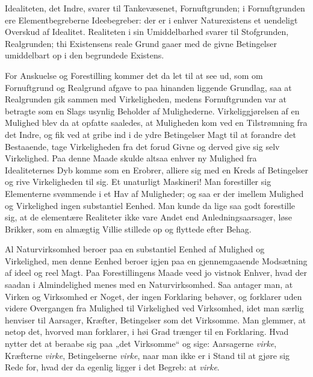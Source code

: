 \documentclass[12pt,a4paper]{book}
\begin{document}
Idealiteten, det Indre, svarer til Tankevæsenet, Fornuftgrunden; i
Fornuftgrunden ere Elementbegreberne Ideebegreber: der er i enhver
Naturexistens et uendeligt Overskud af Idealitet. Realiteten i sin
Umiddelbarhed svarer til Stofgrunden, Realgrunden; thi Existensens reale
Grund gaaer med de givne Betingelser umiddelbart op i den begrundede
Existens.

For Anskuelse og Forestilling kommer det da let til at see ud, som om
Fornuftgrund og Realgrund afgave to paa hinanden liggende Grundlag, saa at
Realgrunden gik sammen med Virkeligheden, medens Fornuftgrunden var at
betragte som en Slags usynlig Beholder af Mulighederne. Virkeliggjørelsen
af en Mulighed blev da at opfatte saaledes, at Muligheden kom ved en
Tilstrømning fra det Indre, og fik ved at gribe ind i de ydre Betingelser
Magt til at forandre det Bestaaende, tage Virkeligheden fra det forud
Givne og derved give sig selv Virkelighed. Paa denne Maade skulde altsaa
enhver ny Mulighed fra Idealiteternes Dyb komme som en Erobrer, alliere
sig med en Kreds af Betingelser og rive Virkeligheden til sig. Et
unaturligt Maskineri! Man forestiller sig Elementerne svømmende i et Hav
af Muligheder; og saa er der imellem Mulighed og Virkelighed ingen
substantiel Eenhed. Man kunde da lige saa godt forestille sig, at de
elementære Realiteter ikke vare Andet end Anledningsaarsager, løse
Brikker, som en almægtig Villie stillede op og flyttede efter Behag.

Al Naturvirksomhed beroer paa en substantiel Eenhed af Mulighed og
Virkelighed, men denne Eenhed beroer igjen paa en gjennemgaaende
Modsætning af ideel og reel Magt. Paa Forestillingens Maade veed jo
vistnok Enhver, hvad der saadan i Almindelighed menes med en
Naturvirksomhed. Saa antager man, at Virken og Virksomhed er Noget, der
ingen Forklaring behøver, og forklarer uden videre Overgangen fra Mulighed
til Virkelighed ved Virksomhed, idet
man særlig henviser til Aarsager, Kræfter, Betingelser som det Virksomme.
Man glemmer, at netop det, hvorved man forklarer, i høi Grad trænger til
en Forklaring. Hvad nytter det at beraabe sig paa „det Virksomme“ og sige:
Aarsagerne \emph{virke}, Kræfterne \emph{virke}, Betingelserne
\emph{virke}, naar man ikke er i Stand til at gjøre sig Rede for, hvad der
da egenlig ligger i det Begreb: at \emph{virke}.
\end{document}
